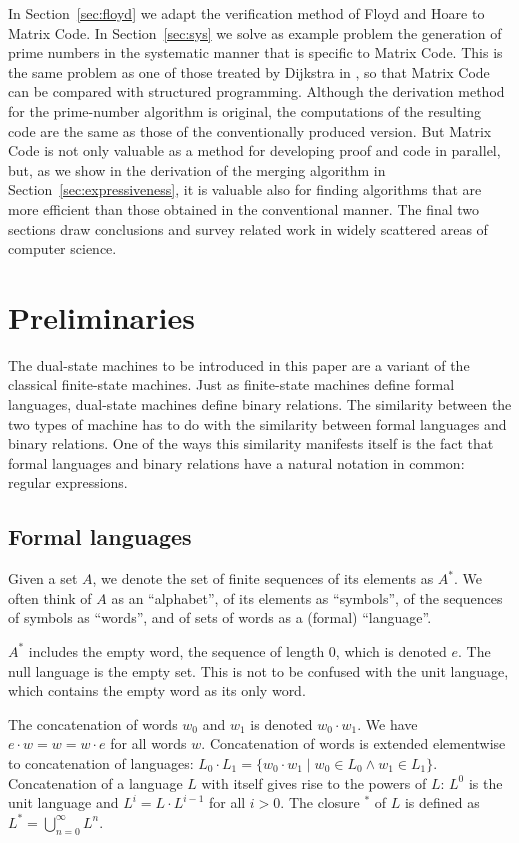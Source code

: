 \documentclass[preprint,11pt]{elsarticle}
\begin{document}
In Section~\ref{sec:floyd} we
adapt the verification method of Floyd and Hoare to
Matrix Code.
In Section~\ref{sec:sys}
we solve as example problem the generation of prime numbers
in the systematic manner that is specific to Matrix Code.
This is the same problem as one of those treated by Dijkstra
in \cite{djkddh72},
so that Matrix Code can be compared with structured programming.
Although the derivation method for the prime-number
algorithm is original,
the computations of the resulting code are the same
as those of the conventionally produced version.
But Matrix Code is not only valuable as a method
for developing proof and code in parallel,
but, as we show in the derivation of the merging algorithm
in Section~\ref{sec:expressiveness},
it is valuable also
for finding algorithms that are more efficient
than those obtained in the conventional manner.
The final two sections
draw conclusions and survey related work
in widely scattered areas of computer science.

\section{Preliminaries}
\label{sec:prelim}

The dual-state machines to be introduced in this paper
are a variant of the classical finite-state machines.
Just as finite-state machines define formal languages,
dual-state machines define binary relations.
The similarity between the two types of machine
has to do with the similarity between formal languages
and binary relations.
One of the ways this similarity manifests itself
is the fact that formal languages and binary relations
have a natural notation in common: regular expressions.

\subsection{Formal languages}
Given a set $A$, we denote the set of finite sequences
of its elements as $A^*$.
We often think of $A$ as an ``alphabet'',
of its elements as ``symbols'',
of the sequences of symbols as ``words'',
and of sets of words as a (formal) ``language''.

$A^*$ includes the empty word,
the sequence of length 0, which is denoted $e$.
The null language is the empty set.
This is not to be confused with the unit language,
which contains the empty word as its only word.

The concatenation of words $w_0$ and $w_1$ is denoted 
$w_0 \cdot w_1$.
We have
$e\cdot w = w = w\cdot e$
for all words $w$.
Concatenation of words is extended elementwise to
concatenation of languages:
$L_0 \cdot L_1 =
  \{w_0\cdot w_1 \mid w_0 \in L_0 \wedge w_1 \in L_1 \}.$
Concatenation of a language $L$ with itself
gives rise to the powers of $L$:
$L^0$ is the unit language
and $L^i = L\cdot L^{i-1}$ for all $i>0$.
The closure $^*$ of $L$ is defined as
$L^* = \bigcup_{n=0}^\infty L^n$.
\end{document}
